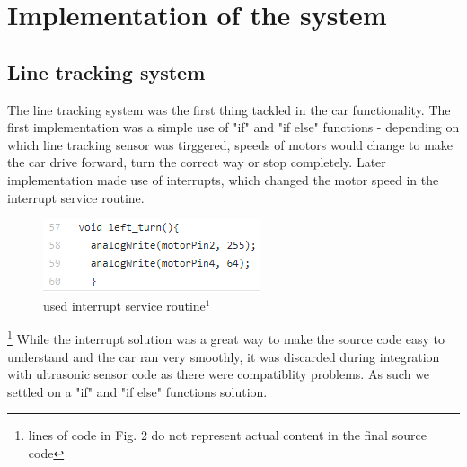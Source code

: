 \documentclass[conference]{IEEEtran}
\begin{document}
\section{Implementation of the system}
\subsection{Line tracking system}
The line tracking system was the first thing tackled in the car functionality. The first implementation was a simple use of "if" and "if else" functions - depending on which line tracking sensor was tirggered, speeds of motors would change to make the car drive forward, turn the correct way or stop completely. Later implementation made use of interrupts, which changed the motor speed in the interrupt service routine.
\begin{figure}[h!]
	\includegraphics[width=\linewidth]{examplecode1.png}
	\caption{used interrupt service routine$^{1}$}
	\label{fig:EXC1}
\end{figure}
\footnote{lines of code in Fig. 2 do not represent actual content in the final source code}
While the interrupt solution was a great way to make the source code easy to understand and the car ran very smoothly, it was discarded during integration with ultrasonic sensor code as there were compatiblity problems. As such we settled on a "if" and "if else" functions solution.
\end{document}
